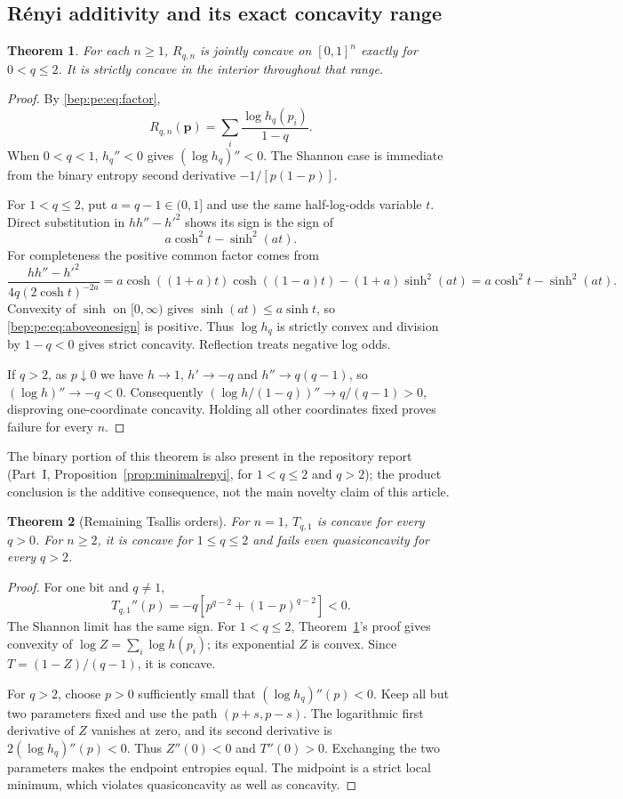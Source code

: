 \documentclass[11pt]{article}
\numberwithin{equation}{section}
\newtheorem{theorem}{Theorem}[section]
\theoremstyle{definition}
\theoremstyle{remark}
\newcommand{\p}{\boldsymbol p}
\begin{document}
\subsection{R\'enyi additivity and its exact concavity range}
\begin{theorem}\label{bep:pe:thm:renyi}
For each $n\geq1$, $R_{q,n}$ is jointly concave on $[0,1]^n$ exactly for
$0<q\leq2$. It is strictly concave in the interior throughout that range.
\end{theorem}
\begin{proof}
By \eqref{bep:pe:eq:factor},
\[
 R_{q,n}(\p)=\sum_i\frac{\log h_q(p_i)}{1-q}.
\]
When $0<q<1$, $h_q''<0$ gives $(\log h_q)''<0$. The Shannon case is
immediate from the binary entropy second derivative
$-1/[p(1-p)]$.

For $1<q\leq2$, put $a=q-1\in(0,1]$ and use the same half-log-odds
variable $t$. Direct substitution in $hh''-h'^2$ shows its sign is the
sign of
\begin{equation}
 a\cosh^2t-\sinh^2(at).\label{bep:pe:eq:aboveonesign}
\end{equation}
For completeness the positive common factor comes from
\[
 \frac{hh''-h'^2}{4q(2\cosh t)^{-2a}}
 =a\cosh((1+a)t)\cosh((1-a)t)-(1+a)\sinh^2(at)
 =a\cosh^2t-\sinh^2(at).
\]
Convexity of $\sinh$ on $[0,\infty)$ gives
$\sinh(at)\leq a\sinh t$, so \eqref{bep:pe:eq:aboveonesign} is positive.
Thus $\log h_q$ is strictly convex and division by $1-q<0$ gives
strict concavity. Reflection treats negative log odds.

If $q>2$, as $p\downarrow0$ we have $h\to1$, $h'\to-q$ and
$h''\to q(q-1)$, so $(\log h)''\to-q<0$. Consequently
$(\log h/(1-q))''\to q/(q-1)>0$, disproving one-coordinate concavity.
Holding all other coordinates fixed proves failure for every $n$.
\end{proof}
The binary portion of this theorem is also present in the repository
report (Part~I, Proposition~\ref{prop:minimalrenyi}, for $1<q\leq2$ and
$q>2$); the product conclusion is the additive
consequence, not the main novelty claim of this article.

\begin{theorem}[Remaining Tsallis orders]\label{bep:pe:thm:tsallisabove}
For $n=1$, $T_{q,1}$ is concave for every $q>0$. For $n\geq2$, it is
concave for $1\leq q\leq2$ and fails even quasiconcavity for every $q>2$.
\end{theorem}
\begin{proof}
For one bit and $q\ne1$,
\[
 T_{q,1}''(p)=-q[p^{q-2}+(1-p)^{q-2}]<0.
\]
The Shannon limit has the same sign. For $1<q\leq2$,
Theorem~\ref{bep:pe:thm:renyi}'s proof gives convexity of
$\log Z=\sum_i\log h(p_i)$; its exponential $Z$ is convex.
Since $T=(1-Z)/(q-1)$, it is concave.

For $q>2$, choose $p>0$ sufficiently small that
$(\log h_q)''(p)<0$. Keep all but two parameters fixed and use the path
$(p+s,p-s)$. The logarithmic first derivative of $Z$ vanishes at zero,
and its second derivative is $2(\log h_q)''(p)<0$. Thus $Z''(0)<0$ and
$T''(0)>0$. Exchanging the two parameters makes the endpoint entropies
equal. The midpoint is a strict local minimum, which violates
quasiconcavity as well as concavity.
\end{proof}
\end{document}
